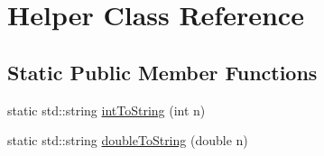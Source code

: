 \hypertarget{class_helper}{\section{\-Helper \-Class \-Reference}
\label{class_helper}
}
\subsection*{\-Static \-Public \-Member \-Functions}
\begin{DoxyCompactItemize}
\item 
static std\-::string \hyperlink{class_helper_aea19db1a4a7d6d3d793584fe8afab244}{int\-To\-String} (int n)
\item 
static std\-::string \hyperlink{class_helper_a43074fd7be9b2f43cc6e34941b25cc63}{double\-To\-String} (double n)
\end{DoxyCompactItemize}


